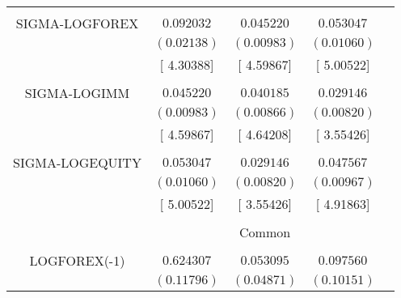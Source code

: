 \begin{tabular}{lrrrr}
\multicolumn{1}{c}{}&\multicolumn{1}{c}{}&\multicolumn{1}{c}{}&\multicolumn{1}{c}{}&\multicolumn{1}{c}{}\\
\multicolumn{1}{c}{SIGMA-LOGFOREX}&\multicolumn{1}{c}{$0.092032$}&\multicolumn{1}{c}{$0.045220$}&\multicolumn{1}{c}{$0.053047$}&\multicolumn{1}{c}{}\\
\multicolumn{1}{c}{}&\multicolumn{1}{c}{$(0.02138)$}&\multicolumn{1}{c}{$(0.00983)$}&\multicolumn{1}{c}{$(0.01060)$}&\multicolumn{1}{c}{}\\
\multicolumn{1}{c}{}&\multicolumn{1}{c}{[ 4.30388]}&\multicolumn{1}{c}{[ 4.59867]}&\multicolumn{1}{c}{[ 5.00522]}&\multicolumn{1}{c}{}\\
\multicolumn{1}{c}{}&\multicolumn{1}{c}{}&\multicolumn{1}{c}{}&\multicolumn{1}{c}{}&\multicolumn{1}{c}{}\\
\multicolumn{1}{c}{SIGMA-LOGIMM}&\multicolumn{1}{c}{$0.045220$}&\multicolumn{1}{c}{$0.040185$}&\multicolumn{1}{c}{$0.029146$}&\multicolumn{1}{c}{}\\
\multicolumn{1}{c}{}&\multicolumn{1}{c}{$(0.00983)$}&\multicolumn{1}{c}{$(0.00866)$}&\multicolumn{1}{c}{$(0.00820)$}&\multicolumn{1}{c}{}\\
\multicolumn{1}{c}{}&\multicolumn{1}{c}{[ 4.59867]}&\multicolumn{1}{c}{[ 4.64208]}&\multicolumn{1}{c}{[ 3.55426]}&\multicolumn{1}{c}{}\\
\multicolumn{1}{c}{}&\multicolumn{1}{c}{}&\multicolumn{1}{c}{}&\multicolumn{1}{c}{}&\multicolumn{1}{c}{}\\
\multicolumn{1}{c}{SIGMA-LOGEQUITY}&\multicolumn{1}{c}{$0.053047$}&\multicolumn{1}{c}{$0.029146$}&\multicolumn{1}{c}{$0.047567$}&\multicolumn{1}{c}{}\\
\multicolumn{1}{c}{}&\multicolumn{1}{c}{$(0.01060)$}&\multicolumn{1}{c}{$(0.00820)$}&\multicolumn{1}{c}{$(0.00967)$}&\multicolumn{1}{c}{}\\
\multicolumn{1}{c}{}&\multicolumn{1}{c}{[ 5.00522]}&\multicolumn{1}{c}{[ 3.55426]}&\multicolumn{1}{c}{[ 4.91863]}&\multicolumn{1}{c}{}\\
[4.5pt] \hline \\ [-4.5pt]
\multicolumn{1}{c}{}&\multicolumn{3}{c}{Common}&\multicolumn{1}{c}{}\\
[4.5pt] \hline \\ [-4.5pt]
\multicolumn{1}{c}{LOGFOREX(-1)}&\multicolumn{1}{c}{$0.624307$}&\multicolumn{1}{c}{$0.053095$}&\multicolumn{1}{c}{$0.097560$}&\multicolumn{1}{c}{}\\
\multicolumn{1}{c}{}&\multicolumn{1}{c}{$(0.11796)$}&\multicolumn{1}{c}{$(0.04871)$}&\multicolumn{1}{c}{$(0.10151)$}&\multicolumn{1}{c}{}\\

\end{tabular}
